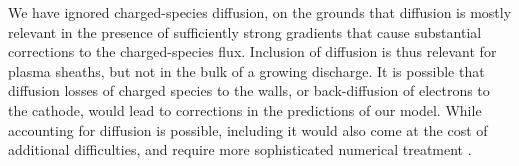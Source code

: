 \documentclass{iopjournal}
\newcommand{\e}{\ensuremath{\text{e}}}
\begin{document}


We have ignored charged-species diffusion, on the grounds that diffusion is mostly relevant in the presence of sufficiently strong gradients that cause substantial corrections to the charged-species flux.
Inclusion of diffusion is thus relevant for plasma sheaths, but not in the bulk of a growing discharge.
It is possible that diffusion losses of charged species to the walls, or back-diffusion of electrons to the cathode, would lead to corrections in the predictions of our model.
While accounting for diffusion is possible, including it would also come at the cost of additional difficulties, and require more sophisticated numerical treatment \cite{Ferreira2019, Almeida2020, Ferreira2021}.
\end{document}
